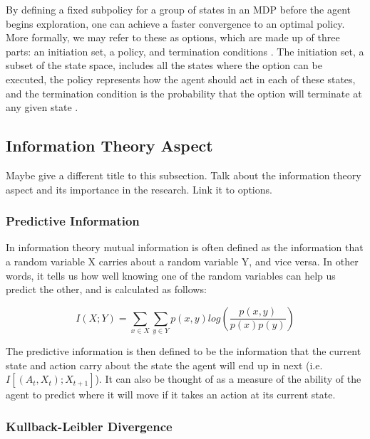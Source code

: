 \documentclass{acm_proc_article-sp}
\begin{document}
By defining a fixed subpolicy for a group of states in an MDP before the agent begins exploration, one can achieve a faster convergence to an optimal policy. More formally, we may refer to these as options, which are made up of three parts: an initiation set, a policy, and termination conditions \cite{sutton1999between}. The initiation set, a subset of the state space, includes all the states where the option can be executed, the policy represents how the agent should act in each of these states, and the termination condition is the probability that the option will terminate at any given state \cite{sutton1999between}.

\subsection{Information Theory Aspect}

Maybe give a different title to this subsection. Talk about the information theory aspect and its importance in the research. Link it to options.

\subsubsection{Predictive Information}


In information theory mutual information is often defined as the information that a random variable X carries about a random variable Y, and vice versa. In other words, it tells us how well knowing one of the random variables can help us predict the other, and is calculated as follows:

\[I(X; Y) = \sum_{x \in X}\sum_{y \in Y}p(x,y)log(\frac{p(x,y)}{p(x)p(y)})\]

The predictive information is then defined to be the information that the current state and action carry about the state the agent will end up in next (i.e. $I[(A_t,X_t); X_{t+1}]$). It can also be thought of as a measure of the ability of the agent to predict where it will move if it takes an action at its current state. 

\subsubsection{Kullback-Leibler Divergence}

\end{document}
